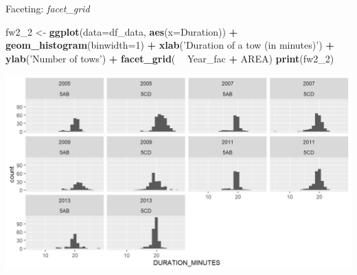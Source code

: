 \documentclass[
  ignorenonframetext,
]{beamer}
\newenvironment{Shaded}{\begin{snugshade}}{\end{snugshade}}
\newcommand{\DataTypeTok}[1]{\textcolor[rgb]{0.13,0.29,0.53}{#1}}
\newcommand{\DecValTok}[1]{\textcolor[rgb]{0.00,0.00,0.81}{#1}}
\newcommand{\KeywordTok}[1]{\textcolor[rgb]{0.13,0.29,0.53}{\textbf{#1}}}
\newcommand{\NormalTok}[1]{#1}
\newcommand{\OperatorTok}[1]{\textcolor[rgb]{0.81,0.36,0.00}{\textbf{#1}}}
\newcommand{\StringTok}[1]{\textcolor[rgb]{0.31,0.60,0.02}{#1}}
\begin{document}
\begin{frame}[fragile]{Faceting: \emph{facet\_grid}}
\protect\hypertarget{faceting-facet_grid-4}{}

\begin{Shaded}
\begin{Highlighting}[]
\NormalTok{fw2_}\DecValTok{2}\NormalTok{ <-}\StringTok{ }\KeywordTok{ggplot}\NormalTok{(}\DataTypeTok{data=}\NormalTok{df_data, }\KeywordTok{aes}\NormalTok{(}\DataTypeTok{x=}\NormalTok{Duration)) }\OperatorTok{+}
\StringTok{  }\KeywordTok{geom_histogram}\NormalTok{(}\DataTypeTok{binwidth=}\DecValTok{1}\NormalTok{) }\OperatorTok{+}\StringTok{ }
\StringTok{  }\KeywordTok{xlab}\NormalTok{(}\StringTok{'Duration of a tow (in minutes)'}\NormalTok{) }\OperatorTok{+}\StringTok{ }\KeywordTok{ylab}\NormalTok{(}\StringTok{'Number of tows'}\NormalTok{) }\OperatorTok{+}
\StringTok{  }\KeywordTok{facet_grid}\NormalTok{( }\OperatorTok{~}\StringTok{ }\NormalTok{Year_fac }\OperatorTok{+}\StringTok{ }\NormalTok{AREA)}
\KeywordTok{print}\NormalTok{(fw2_}\DecValTok{2}\NormalTok{)}
\end{Highlighting}
\end{Shaded}

\begin{center}\includegraphics[width=0.8\linewidth]{figure/facet_wrap_6-1} \end{center}

\end{frame}
\end{document}
